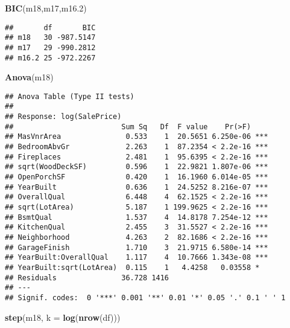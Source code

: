 \documentclass[
]{article}
\newenvironment{Shaded}{\begin{snugshade}}{\end{snugshade}}
\newcommand{\AttributeTok}[1]{\textcolor[rgb]{0.13,0.29,0.53}{#1}}
\newcommand{\FloatTok}[1]{\textcolor[rgb]{0.00,0.00,0.81}{#1}}
\newcommand{\FunctionTok}[1]{\textcolor[rgb]{0.13,0.29,0.53}{\textbf{#1}}}
\newcommand{\NormalTok}[1]{#1}
\begin{document}
\begin{Shaded}
\begin{Highlighting}[]
\FunctionTok{BIC}\NormalTok{(m18,m17,m16}\FloatTok{.2}\NormalTok{)}
\end{Highlighting}
\end{Shaded}

\begin{verbatim}
##       df       BIC
## m18   30 -987.5147
## m17   29 -990.2812
## m16.2 25 -972.2267
\end{verbatim}

\begin{Shaded}
\begin{Highlighting}[]
\FunctionTok{Anova}\NormalTok{(m18)}
\end{Highlighting}
\end{Shaded}

\begin{verbatim}
## Anova Table (Type II tests)
## 
## Response: log(SalePrice)
##                         Sum Sq   Df  F value    Pr(>F)    
## MasVnrArea               0.533    1  20.5651 6.250e-06 ***
## BedroomAbvGr             2.263    1  87.2354 < 2.2e-16 ***
## Fireplaces               2.481    1  95.6395 < 2.2e-16 ***
## sqrt(WoodDeckSF)         0.596    1  22.9821 1.807e-06 ***
## OpenPorchSF              0.420    1  16.1960 6.014e-05 ***
## YearBuilt                0.636    1  24.5252 8.216e-07 ***
## OverallQual              6.448    4  62.1525 < 2.2e-16 ***
## sqrt(LotArea)            5.187    1 199.9625 < 2.2e-16 ***
## BsmtQual                 1.537    4  14.8178 7.254e-12 ***
## KitchenQual              2.455    3  31.5527 < 2.2e-16 ***
## Neighborhood             4.263    2  82.1686 < 2.2e-16 ***
## GarageFinish             1.710    3  21.9715 6.580e-14 ***
## YearBuilt:OverallQual    1.117    4  10.7666 1.343e-08 ***
## YearBuilt:sqrt(LotArea)  0.115    1   4.4258   0.03558 *  
## Residuals               36.728 1416                       
## ---
## Signif. codes:  0 '***' 0.001 '**' 0.01 '*' 0.05 '.' 0.1 ' ' 1
\end{verbatim}

\begin{Shaded}
\begin{Highlighting}[]
\FunctionTok{step}\NormalTok{(m18, }\AttributeTok{k =} \FunctionTok{log}\NormalTok{(}\FunctionTok{nrow}\NormalTok{(df)))}
\end{Highlighting}
\end{Shaded}
\end{document}
